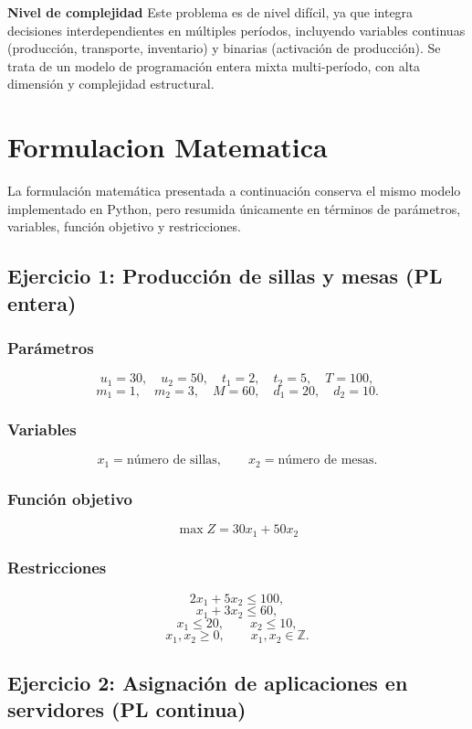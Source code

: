 \documentclass[12pt,a4paper]{article}
\begin{document}
\textbf{Nivel de complejidad} Este problema es de nivel difícil, ya que integra decisiones interdependientes en múltiples períodos, incluyendo variables continuas (producción, transporte, inventario) y binarias (activación de producción). Se trata de un modelo de programación entera mixta multi-período, con alta dimensión y complejidad estructural.

\section{Formulacion Matematica}

La formulación matemática presentada a continuación conserva el mismo modelo implementado en Python, pero resumida únicamente en términos de parámetros, variables, función objetivo y restricciones.

\subsection{Ejercicio 1: Producción de sillas y mesas (PL entera)}

\subsubsection*{Parámetros}
\[
u_1=30,\quad u_2=50,\quad t_1=2,\quad t_2=5,\quad T=100,
\]
\[
m_1=1,\quad m_2=3,\quad M=60,\quad d_1=20,\quad d_2=10.
\]

\subsubsection*{Variables}
\[
x_1=\text{número de sillas},\qquad x_2=\text{número de mesas}.
\]

\subsubsection*{Función objetivo}
\[
\max Z=30x_1+50x_2
\]

\subsubsection*{Restricciones}
\[
2x_1+5x_2\le 100,
\]
\[
x_1+3x_2\le 60,
\]
\[
x_1\le 20,\qquad x_2\le 10,
\]
\[
x_1,x_2\ge 0,\qquad x_1,x_2\in\mathbb{Z}.
\]

\subsection{Ejercicio 2: Asignación de aplicaciones en servidores (PL continua)}
\end{document}
